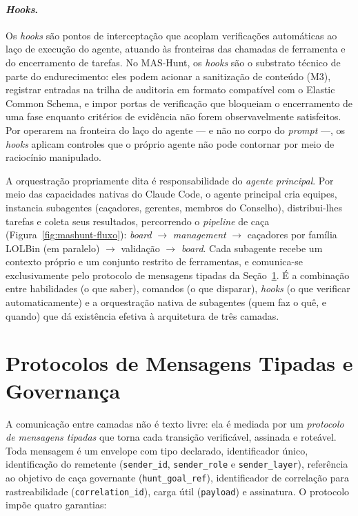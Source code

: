 \paragraph{\emph{Hooks}.} Os \emph{hooks} são pontos de interceptação que acoplam
verificações automáticas ao laço de execução do agente, atuando às fronteiras das
chamadas de ferramenta e do encerramento de tarefas. No MAS-Hunt, os \emph{hooks}
são o substrato técnico de parte do endurecimento: eles podem acionar a
sanitização de conteúdo (M3), registrar entradas na trilha de auditoria em formato
compatível com o Elastic Common Schema, e impor portas de verificação que
bloqueiam o encerramento de uma fase enquanto critérios de evidência não forem
observavelmente satisfeitos. Por operarem na fronteira do laço do agente — e não
no corpo do \emph{prompt} —, os \emph{hooks} aplicam controles que o próprio
agente não pode contornar por meio de raciocínio manipulado.

A orquestração propriamente dita é responsabilidade do \emph{agente principal}.
Por meio das capacidades nativas do Claude Code, o agente principal cria equipes,
instancia subagentes (caçadores, gerentes, membros do Conselho), distribui-lhes
tarefas e coleta seus resultados, percorrendo o \emph{pipeline} de caça
(Figura~\ref{fig:mashunt-fluxo}): \emph{board} $\rightarrow$ \emph{management}
$\rightarrow$ caçadores por família LOLBin (em paralelo) $\rightarrow$ validação
$\rightarrow$ \emph{board}. Cada subagente recebe um contexto próprio e um conjunto
restrito de ferramentas, e comunica-se exclusivamente pelo protocolo de mensagens
tipadas da Seção~\ref{sec:arq-protocolos}. É a combinação entre habilidades (o
que saber), comandos (o que disparar), \emph{hooks} (o que verificar
automaticamente) e a orquestração nativa de subagentes (quem faz o quê, e quando)
que dá existência efetiva à arquitetura de três camadas.

\section{Protocolos de Mensagens Tipadas e Governança}
\label{sec:arq-protocolos}

A comunicação entre camadas não é texto livre: ela é mediada por um
\emph{protocolo de mensagens tipadas} que torna cada transição verificável,
assinada e roteável. Toda mensagem é um envelope com tipo declarado, identificador
único, identificação do remetente (\texttt{sender\_id}, \texttt{sender\_role} e
\texttt{sender\_layer}), referência ao objetivo de caça governante
(\texttt{hunt\_goal\_ref}), identificador de correlação para rastreabilidade
(\texttt{correlation\_id}), carga útil (\texttt{payload}) e assinatura. O
protocolo impõe quatro garantias:

